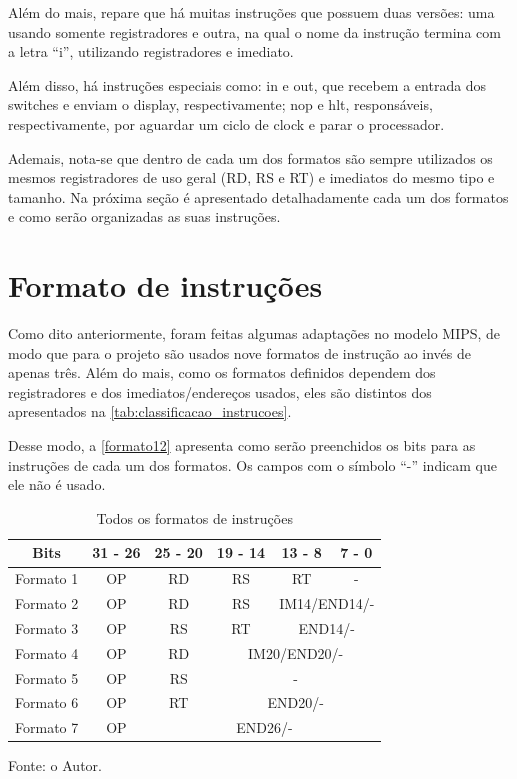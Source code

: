 \documentclass[
	12pt,				%
	oneside,
	a4paper,			%
	english,			%
	french,				%
	spanish,			%
	brazil,				%
	]{abntex2}
\begin{document}
Além do mais, repare que há muitas instruções que possuem duas versões: uma usando somente registradores e outra, na qual o nome da instrução termina com a letra ``i'', utilizando registradores e imediato. 

Além disso, há instruções especiais como: in e out, que recebem a entrada dos switches e enviam o display, respectivamente;
nop e hlt, responsáveis, respectivamente, por aguardar um ciclo de clock e parar o processador.

Ademais, nota-se que dentro de cada um dos formatos são sempre utilizados os mesmos registradores de uso geral (RD, RS e RT) e imediatos do mesmo tipo e tamanho. Na próxima seção é apresentado detalhadamente cada um dos formatos e como serão organizadas as suas instruções.

\section{Formato de instruções}

Como dito anteriormente, foram feitas algumas adaptações no modelo MIPS, de modo que para o projeto são usados nove formatos de instrução ao invés de apenas três. Além do mais, como os formatos definidos dependem dos registradores e dos imediatos/endereços usados, eles são distintos dos apresentados na \autoref{tab:classificacao_instrucoes}.

Desse modo, a \autoref{formato12} apresenta como serão preenchidos os bits para as instruções de cada um dos formatos. Os campos com o símbolo ``-'' indicam que ele não é usado. 

\setlength{\tabcolsep}{15pt} %
\begin{table}[H]
\centering
\caption{Todos os formatos de instruções}
\label{formato12}
\begin{tabular}{|c|c|c|c|c|c|}
\hline
Bits & 31 - 26 & 25 - 20 & 19 - 14 & 13 - 8 & 7 - 0 \\
\hline
Formato 1 & OP & RD & RS & RT & - \\
\hline
Formato 2 & OP & RD & RS & \multicolumn{2}{|c|}{IM14/END14/-} \\
\hline
Formato 3 & OP & RS & RT & \multicolumn{2}{|c|}{END14/-} \\
\hline
Formato 4 & OP & RD & \multicolumn{3}{|c|}{IM20/END20/-} \\
\hline
Formato 5 & OP & RS & \multicolumn{3}{|c|}{-} \\
\hline
Formato 6 & OP & RT & \multicolumn{3}{|c|}{END20/-} \\
\hline
Formato 7 & OP & \multicolumn{4}{|c|}{END26/-} \\
\hline
\end{tabular}
\vspace{-0.5em}
\begin{center}
Fonte: o Autor.
\end{center}
\end{table}
\end{document}
